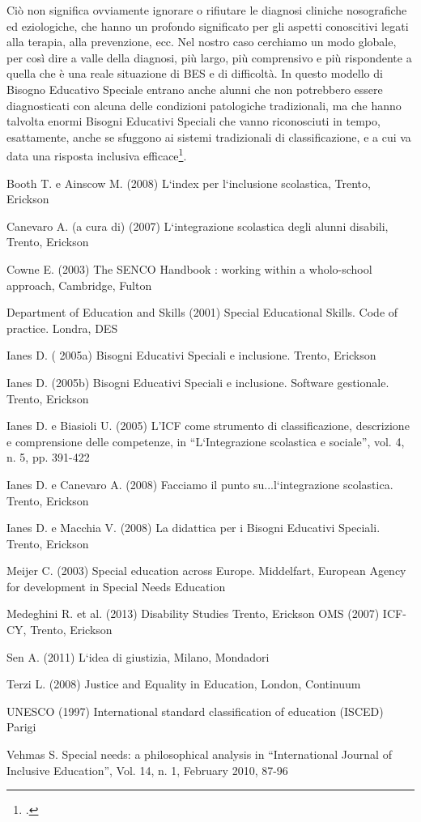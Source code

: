 Ciò non significa ovviamente ignorare o rifiutare le diagnosi cliniche nosografiche ed
eziologiche, che hanno un profondo significato per gli aspetti conoscitivi legati alla terapia, alla
prevenzione, ecc. Nel nostro caso cerchiamo un modo globale, per così dire a valle della diagnosi,
più largo, più comprensivo e più rispondente a quella che è una reale situazione di BES e di
difficoltà. In questo modello di Bisogno Educativo Speciale entrano anche alunni che non
potrebbero essere diagnosticati con alcuna delle condizioni patologiche tradizionali, ma che hanno
talvolta enormi Bisogni Educativi Speciali che vanno riconosciuti in tempo, esattamente, anche se
sfuggono ai sistemi tradizionali di classificazione, e a cui va data una risposta inclusiva efficace\footcite{Ianes2013}.

Booth T. e Ainscow M. (2008) L`index per l`inclusione scolastica, Trento, Erickson

Canevaro A. (a cura di) (2007) L`integrazione scolastica degli alunni disabili, Trento,
Erickson

Cowne E. (2003) The SENCO Handbook : working within a wholo-school approach,
Cambridge, Fulton

Department of Education and Skills (2001) Special Educational Skills. Code of practice. Londra,
DES

Ianes D. ( 2005a) Bisogni Educativi Speciali e inclusione. Trento, Erickson

Ianes D. (2005b) Bisogni Educativi Speciali e inclusione. Software gestionale. Trento, Erickson

Ianes D. e Biasioli U. (2005) L'ICF come strumento di classificazione, descrizione e
comprensione delle competenze, in “L`Integrazione scolastica e sociale”, vol. 4, n. 5, pp. 391-422

Ianes D. e Canevaro A. (2008) Facciamo il punto su...l`integrazione scolastica. Trento, Erickson

Ianes D. e Macchia V. (2008) La didattica per i Bisogni Educativi Speciali. Trento, Erickson

Meijer C. (2003) Special education across Europe. Middelfart, European Agency for
development in Special Needs Education

Medeghini R. et al. (2013) Disability Studies Trento, Erickson
OMS (2007) ICF-CY, Trento, Erickson

Sen A. (2011) L`idea di giustizia, Milano, Mondadori

Terzi L. (2008) Justice and Equality in Education, London, Continuum

UNESCO (1997) International standard classification of education (ISCED) Parigi

Vehmas S. Special needs: a philosophical analysis in “International Journal of Inclusive
Education”, Vol. 14, n. 1, February 2010, 87-96
